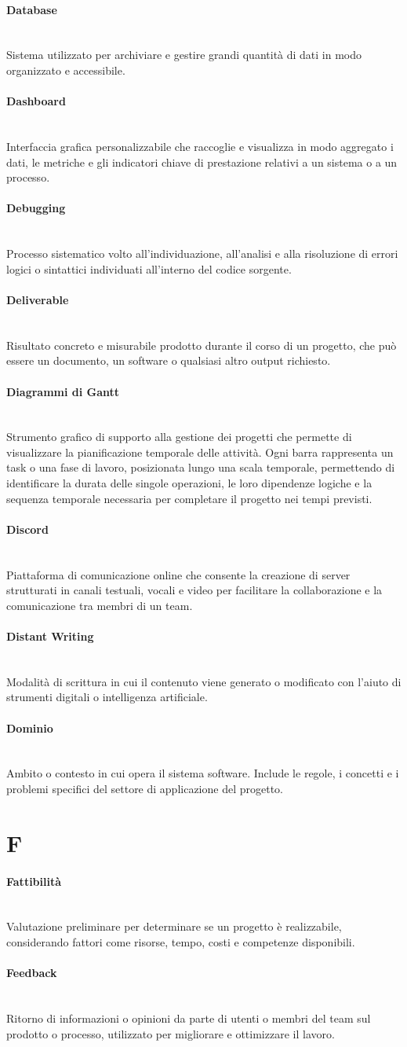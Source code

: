 \documentclass[a4paper, 10pt, colorlinks=true, linkcolor=black, urlcolor=blue, citecolor=blue, hidelinks]{article}
\newcommand{\glossaryterm}[2]{
    \paragraph{#1 \label{term:#1}} \mbox{} \\
    #2
    \vspace{0.5em}
}
\begin{document}
\glossaryterm{Database}{Sistema utilizzato per archiviare e gestire grandi quantità di dati in modo organizzato e accessibile.}

\glossaryterm{Dashboard}{Interfaccia grafica personalizzabile che raccoglie e visualizza in modo aggregato i dati, le metriche e gli indicatori chiave di prestazione relativi a un sistema o a un processo.}

\glossaryterm{Debugging}{Processo sistematico volto all'individuazione, all'analisi e alla risoluzione di errori logici o sintattici individuati all'interno del codice sorgente.}

\glossaryterm{Deliverable}{Risultato concreto e misurabile prodotto durante il corso di un progetto, che può essere un documento, un software o qualsiasi altro output richiesto.}

\glossaryterm{Diagrammi di Gantt}{Strumento grafico di supporto alla gestione dei progetti che permette di visualizzare la pianificazione temporale delle attività. Ogni barra rappresenta un task o una fase di lavoro, posizionata lungo una scala temporale, permettendo di identificare la durata delle singole operazioni, le loro dipendenze logiche e la sequenza temporale necessaria per completare il progetto nei tempi previsti.}

\glossaryterm{Discord}{Piattaforma di comunicazione online che consente la creazione di server strutturati in canali testuali, vocali e video per facilitare la collaborazione e la comunicazione tra membri di un team.}

\glossaryterm{Distant Writing}{Modalità di scrittura in cui il contenuto viene generato o modificato con l'aiuto di strumenti digitali o intelligenza artificiale.}

\glossaryterm{Dominio}{Ambito o contesto in cui opera il sistema software. Include le regole, i concetti e i problemi specifici del settore di applicazione del progetto.}

\newpage

\section*{F}

\glossaryterm{Fattibilità}{Valutazione preliminare per determinare se un progetto è realizzabile, considerando fattori come risorse, tempo, costi e competenze disponibili.}

\glossaryterm{Feedback}{Ritorno di informazioni o opinioni da parte di utenti o membri del team sul prodotto o processo, utilizzato per migliorare e ottimizzare il lavoro.}
\end{document}
